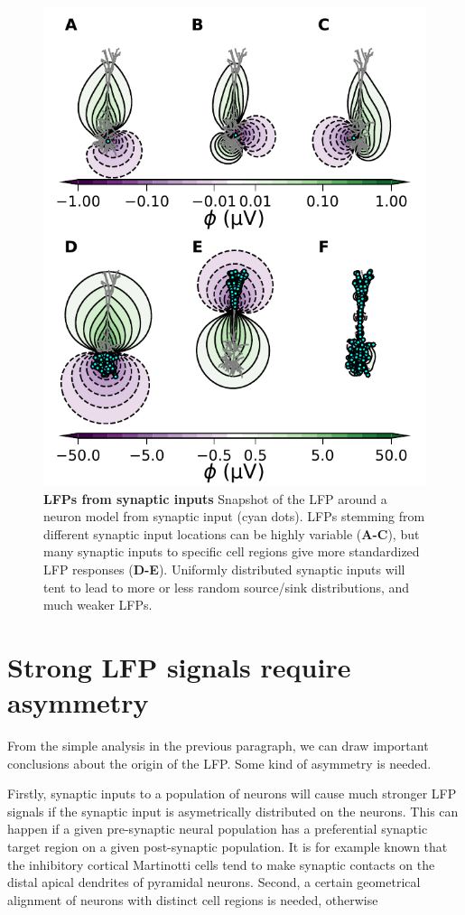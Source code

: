 \begin{figure}[!ht]
\begin{center}
\includegraphics[width=.6\textwidth]{Figures/LFP/fig_chosen_dipoles.pdf}
\end{center}
\caption{\textbf{LFPs from synaptic inputs}
Snapshot of the LFP around a neuron model from synaptic input (cyan dots). LFPs stemming from different synaptic input locations can be highly variable ({\bf A-C}), but many synaptic inputs to specific cell regions give more standardized LFP responses ({\bf D-E}). Uniformly distributed synaptic inputs will tent to lead to more or less random source/sink distributions, and much weaker LFPs.
}
\label{LFP:fig:LFP_dipoles}
\end{figure}


\section{Strong LFP signals require asymmetry}
From the simple analysis in the previous paragraph, we can draw important conclusions about the origin of the LFP. 
Some kind of asymmetry is needed.

Firstly, synaptic inputs to a population of neurons will cause much stronger LFP signals if the synaptic input is asymetrically distributed on the neurons. This can happen if a given pre-synaptic neural population has a preferential synaptic target region on a given post-synaptic population. It is for example known that the inhibitory cortical Martinotti cells tend to make synaptic contacts on the distal apical dendrites of pyramidal neurons. Second, a certain geometrical alignment of neurons with distinct cell regions is needed, otherwise 




